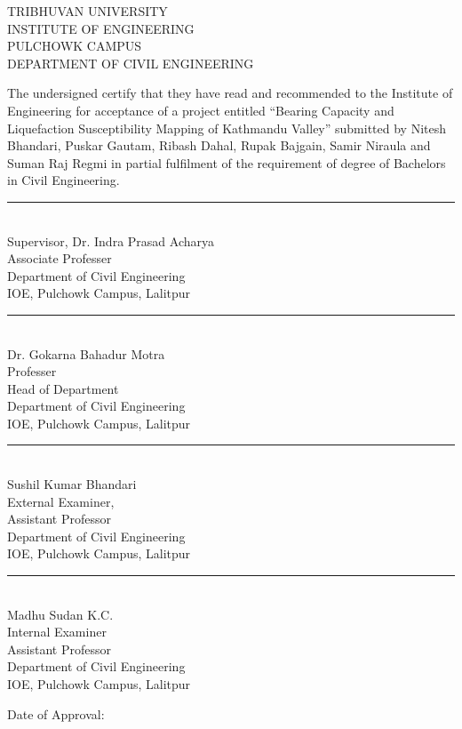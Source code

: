 \begin{titlepage}
\begin{center}
	\large 
	TRIBHUVAN UNIVERSITY\\
	INSTITUTE OF ENGINEERING\\
	PULCHOWK CAMPUS\\
	DEPARTMENT OF CIVIL ENGINEERING
\end{center}
\vfill
The undersigned certify that they have read and recommended to the Institute of Engineering for acceptance of a project entitled “Bearing Capacity and Liquefaction Susceptibility Mapping of Kathmandu Valley” submitted by Nitesh Bhandari, Puskar Gautam, Ribash Dahal, Rupak Bajgain, Samir Niraula and Suman Raj Regmi in partial fulfilment of the requirement of degree of Bachelors in Civil Engineering.
\vfill

\begin{minipage}[t]{0.48\linewidth}
\rule{0.7\textwidth}{0.4pt}\\
Supervisor, Dr. Indra Prasad Acharya\\
Associate Professer\\
Department of Civil Engineering\\
IOE, Pulchowk Campus, Lalitpur
\end{minipage}%
\begin{minipage}[t]{0.48\linewidth}
\rule{0.7\textwidth}{0.4pt}\\
Dr. Gokarna Bahadur Motra\\
Professer\\
Head of Department\\
Department of Civil Engineering\\
IOE, Pulchowk Campus, Lalitpur
\end{minipage}

\vfill
\begin{minipage}[t]{0.48\linewidth}
\rule{0.7\textwidth}{0.4pt}\\
Sushil Kumar Bhandari\\
External Examiner,\\
Assistant Professor\\
Department of Civil Engineering\\
IOE, Pulchowk Campus, Lalitpur
\end{minipage}%
\begin{minipage}[t]{0.48\linewidth}
\rule{0.7\textwidth}{0.4pt}\\
Madhu Sudan K.C.\\
Internal Examiner\\
Assistant Professor\\
Department of Civil Engineering\\
IOE, Pulchowk Campus, Lalitpur
\end{minipage}

\vfill

Date of Approval:
\end{titlepage}